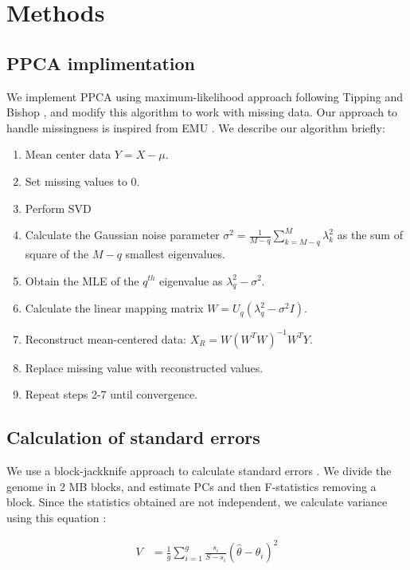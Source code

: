 \documentclass[12pt, letterpaper]{article}
\begin{document}
\section{Methods}

\subsection{PPCA implimentation}\label{method-ppca}

We implement PPCA using maximum-likelihood approach following Tipping and                Bishop \cite{tipping_probabilistic_nodate}, and modify this algorithm to work with missing data. Our approach to handle missingness is inspired from EMU \cite{meisner_large-scale_2021}. We describe our algorithm briefly:
\begin{enumerate}
    \item Mean center data $Y = X - \mu$.
    \item Set missing values to 0.
    \item Perform SVD
    \item Calculate the Gaussian noise parameter $\sigma^2 = \frac{1}{M-q} \sum_{k=M-q}^ M \lambda_k^2$ as the sum of square of the $M-q$ smallest eigenvalues.
    \item Obtain the MLE of the $q^{th}$ eigenvalue as $\lambda_q^2 - \sigma^2$.
    \item Calculate the linear mapping matrix $W = U_q (\lambda_q^2 - \sigma^2I)$.
    \item Reconstruct mean-centered data: $X_R = W(W^TW)^{-1}W^TY$.
    \item Replace missing value with reconstructed values.
    \item Repeat steps 2-7 until convergence.
\end{enumerate}


\subsection{Calculation of standard errors}

We use a block-jackknife approach to calculate standard errors \cite{maier_limits_2022}. We divide the genome in 2 MB blocks, and estimate PCs and then F-statistics removing a block. Since the statistics obtained are not independent, we calculate variance using this equation \cite{maier_limits_2022}:

\begin{align}\label{eq:bjk_var}
V &= \frac{1}{g} \sum_{i=1}^g \frac{s_i}{S-s_i} (\hat{\theta} - \theta_i)^2
\end{align}
\end{document}

